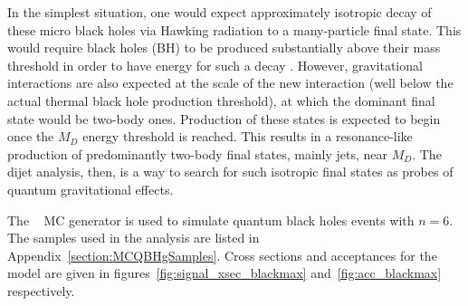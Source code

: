 In the simplest situation, one would expect approximately isotropic decay of these micro black holes via Hawking
radiation to a many-particle final state. This would require black holes (BH) to be produced substantially
above their mass threshold in order to have energy for such a decay \cite{Feng:2004}. 
However, gravitational interactions are also expected at the scale of the new interaction 
(well below the actual thermal black hole production threshold), at which the dominant final state would be two-body ones.
Production of these
states is expected to begin once the $M_D$ energy threshold is reached. 
This results in a resonance-like production of predominantly
two-body final states, mainly jets, near $M_D$. The dijet analysis, then, is a way to search for such
isotropic final states as probes of quantum gravitational effects.

The \BlackMax~\cite{Dai:2007ki} MC generator is used to simulate quantum black holes events with $n=6$. The samples used in the analysis
are listed in Appendix~\ref{section:MCQBHgSamples}. Cross sections and acceptances for the model are given in figures~\ref{fig:signal_xsec_blackmax} and~\ref{fig:acc_blackmax} respectively.

